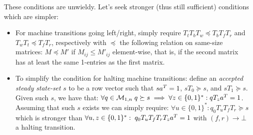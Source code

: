 These conditions are unwieldy. Let's seek stronger (thus still sufficient) conditions which are simpler:

\begin{itemize}

  \item For machine transitions going left/right, simply require $T_t T_b T_w\preceq T_b T_f T_r$ and $T_w T_t\preceq T_f T_r$, respectively with $\preceq$ the following relation on same-size matrices: $M\preceq M'$ if $M_{ij}\le M'_{ij}$ element-wise, that is, if the second matrix has at least the same 1-entries as the first matrix.

  \item To simplify the condition for halting machine transitions: define an \emph{accepted steady state-set} $s$ to be a row vector such that $sa^T = 1$, $s T_0\succeq s$, and $s T_1\succeq s$. Given such $s$, we have that: $\forall q\in\mathcal{M}_{1,n}\; q \succeq s\implies \forall z\in\{0, 1\}^*: qT_{z}a^T = 1$. Assuming that such $s$ exists we can simply require: $\forall u\in\{0, 1\}^*: q_0T_u T_f T_r \succeq s$ which is stronger than $\forall u,z\in\{0, 1\}^*: \; q_0 T_u T_f T_r T_z a^T = 1$ with $(f,r) \to \bot$ a halting transition.



\end{itemize}

